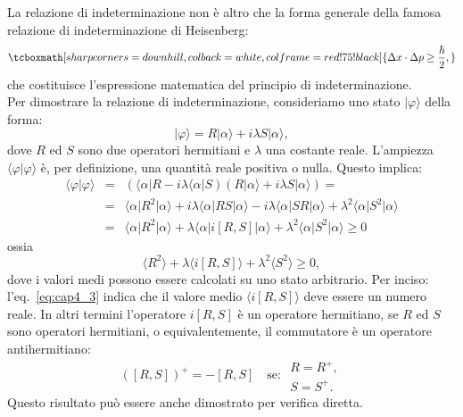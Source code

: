 La relazione di indeterminazione non è altro che la forma generale della famosa relazione di indeterminazione di Heisenberg:
	\begin{equation}
		\tcboxmath[sharp corners=downhill ,colback=white,colframe=red!75!black]{
		\Delta x \cdot \Delta p \geq \frac{\hbar}{2},
		}
	\end{equation}
che costituisce l'espressione matematica del principio di indeterminazione.\\
Per dimostrare la relazione di indeterminazione, consideriamo uno stato $\vert \varphi \rangle$ della forma:
	\begin{equation}
		\vert \varphi \rangle = R\vert \alpha \rangle +i \lambda S \vert \alpha \rangle ,
	\end{equation}
dove $R$ ed $S$ sono due operatori hermitiani e $\lambda $ una costante reale. L'ampiezza $\langle \varphi \vert \varphi \rangle$ è, per definizione, una quantità reale positiva o nulla. Questo implica:
	\begin{eqnarray}
		\langle \varphi \vert \varphi \rangle &=&\left( \langle \alpha \vert R -i \lambda \langle \alpha \vert S \right) \left( R\vert \alpha \rangle +i \lambda S \vert \alpha \rangle  \right) = \nonumber \\
		&=&\langle \alpha \vert R^2 \vert \alpha \rangle + i\lambda \langle \alpha \vert RS \vert \alpha \rangle - i\lambda \langle \alpha \vert SR \vert \alpha \rangle + \lambda ^2 \langle \alpha \vert S^2 \vert \alpha \rangle \nonumber \\
		&=& \langle \alpha \vert R^2 \vert \alpha \rangle + \lambda \langle \alpha \vert i\left[ R,S\right] \vert \alpha \rangle + \lambda ^2 \langle \alpha \vert S^2 \vert \alpha \rangle \geq 0 
\end{eqnarray}
ossia
	\begin{equation}
		\label{eq:cap4_3}
		\langle  R^2  \rangle + \lambda \langle i\left[ R,S \right] \rangle + \lambda ^2 \langle S^2 \rangle \geq 0,
	\end{equation}
dove i valori medi possono essere calcolati su uno stato arbitrario. 
Per inciso: l'eq.~\eqref{eq:cap4_3} indica che il valore medio $\langle i\left[ R,S \right] \rangle$ deve essere un numero reale. In altri termini l'operatore $i\left[R,S	\right]$ è un operatore hermitiano, se $R$ ed $S$ sono operatori hermitiani, o equivalentemente, il commutatore è un operatore antihermitiano:
	\begin{equation}
		\left( \left[R,S \right] \right) ^{+} = - \left[R,S \right] \quad \textrm{se: } \begin{array}{c}
		R=R^{+},\\
		S=S^{+}.
		\end{array}
	\end{equation}
Questo risultato può essere anche dimostrato per verifica diretta.\\ 

